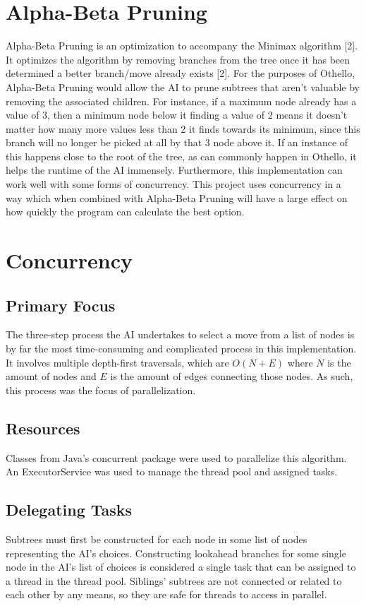 \documentclass[conference]{IEEEtran}
\begin{document}
\section{Alpha-Beta Pruning}
Alpha-Beta Pruning is an optimization to accompany the Minimax algorithm [2]. It optimizes the algorithm by removing branches from the tree once it has been determined a better branch/move already exists [2]. For the purposes of Othello, Alpha-Beta Pruning would allow the AI to prune subtrees that aren’t valuable by removing the associated children. For instance, if a maximum node already has a value of 3, then a minimum node below it finding a value of 2 means it doesn’t matter how many more values less than 2 it finds towards its minimum, since this branch will no longer be picked at all by that 3 node above it. If an instance of this happens close to the root of the tree, as can commonly happen in Othello, it helps the runtime of the AI immensely. Furthermore, this implementation can work well with some forms of concurrency. This project uses concurrency in a way which when combined with Alpha-Beta Pruning will have a large effect on how quickly the program can calculate the best option.

\section{Concurrency}

\subsection{Primary Focus}
The three-step process the AI undertakes to select a move from a list of nodes is by far the most time-consuming and complicated process in this implementation. It involves multiple depth-first traversals, which are $O(N + E)$ where $N$ is the amount of nodes and $E$ is the amount of edges connecting those nodes. As such, this process was the focus of parallelization.


\subsection{Resources}
Classes from Java’s concurrent package were used to parallelize this algorithm. An ExecutorService was used to manage the thread pool and assigned tasks.

\subsection{Delegating Tasks}
Subtrees must first be constructed for each node in some list of nodes representing the AI’s choices. Constructing lookahead branches for some single node in the AI’s list of choices is considered a single task that can be assigned to a thread in the thread pool. Siblings’ subtrees are not connected or related to each other by any means, so they are safe for threads to access in parallel. 
\end{document}
